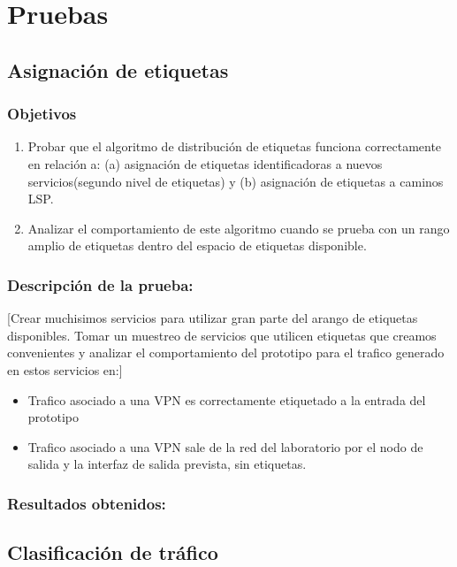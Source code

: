 \section{Pruebas}

\subsection{Asignación de etiquetas}

\subsubsection{Objetivos}
\begin{enumerate}
\item Probar que el algoritmo de distribución de etiquetas funciona correctamente en relación a: (a) asignación de etiquetas identificadoras a nuevos servicios(segundo nivel de etiquetas) y (b) asignación de etiquetas a caminos LSP.
\item Analizar el comportamiento de este algoritmo cuando se prueba con un rango amplio de etiquetas dentro del espacio de etiquetas disponible.
\end{enumerate}

\subsubsection{Descripción de la prueba:}
[Crear muchisimos servicios para utilizar gran parte del arango de etiquetas disponibles. Tomar un muestreo de servicios que utilicen etiquetas que creamos convenientes y analizar el comportamiento del prototipo para el trafico generado en estos servicios en:]

\begin{itemize}
\item Trafico asociado a una VPN es correctamente etiquetado a la entrada del prototipo
\item Trafico asociado a una VPN sale de la red del laboratorio por el nodo de salida y la interfaz de salida prevista, sin etiquetas.
\end{itemize}

\subsubsection{Resultados obtenidos:}

\subsection{Clasificación de tr\'afico}


